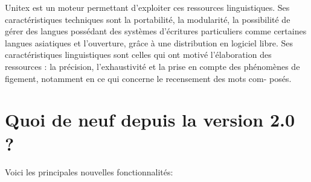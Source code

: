 \bigskip
\noindent Unitex est un moteur permettant d’exploiter ces ressources linguistiques. Ses
caractéristiques techniques sont la portabilité, la modularité, la possibilité de gérer des langues
possédant des systèmes d’écritures particuliers comme certaines langues asiatiques et l’ouverture,
grâce à une distribution en logiciel libre. Ses caractéristiques linguistiques sont celles
qui ont motivé l’élaboration des ressources : la précision, l’exhaustivité et la prise en compte
des phénomènes de figement, notamment en ce qui concerne le recensement des mots com-
posés.




\section*{Quoi de neuf depuis la version 2.0 ?}
Voici les principales nouvelles fonctionnalités:
